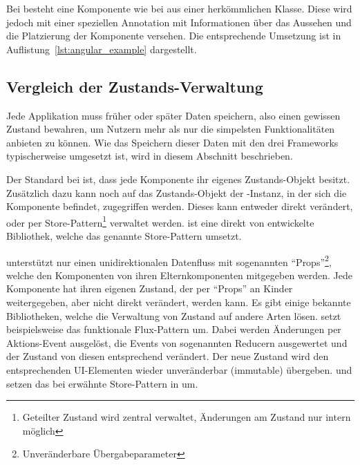\clearpage{}

Bei  besteht eine Komponente wie bei  aus einer herkömmlichen Klasse. Diese wird jedoch mit einer speziellen Annotation mit Informationen über das Aussehen und die Platzierung der Komponente versehen. Die entsprechende Umsetzung ist in Auflistung~\ref{lst:angular_example} dargestellt.



\subsection{Vergleich der Zustands-Verwaltung}
Jede Applikation muss früher oder später Daten speichern, also einen gewissen Zustand bewahren, um Nutzern mehr als nur die simpelsten Funktionalitäten anbieten zu können. Wie das Speichern dieser Daten mit den drei Frameworks typischerweise umgesetzt ist, wird in diesem Abschnitt beschrieben.

Der Standard bei  ist, dass jede Komponente ihr eigenes Zustands-Objekt besitzt. Zusätzlich dazu kann noch auf das Zustands-Objekt der -Instanz, in der sich die Komponente befindet, zugegriffen werden. Dieses kann entweder direkt verändert, oder per Store-Pattern\footnote{Geteilter Zustand wird zentral verwaltet, Änderungen am Zustand nur intern möglich} verwaltet werden.  ist eine direkt von  entwickelte Bibliothek, welche das genannte Store-Pattern umsetzt.

 unterstützt nur einen unidirektionalen Datenfluss mit sogenannten \enquote{Props}\footnote{Unveränderbare Übergabeparameter}, welche den Komponenten von ihren Elternkomponenten mitgegeben werden. Jede Komponente hat ihren eigenen Zustand, der per \enquote{Props} an Kinder weitergegeben, aber nicht direkt verändert, werden kann. Es gibt einige bekannte Bibliotheken, welche die Verwaltung von Zustand auf andere Arten lösen.  setzt beispielsweise das funktionale Flux-Pattern um. Dabei werden Änderungen per Aktions-Event ausgelöst, die Events von sogenannten Reducern ausgewertet und der Zustand von diesen entsprechend verändert. Der neue Zustand wird den entsprechenden UI-Elementen wieder unveränderbar (immutable) übergeben.  und  setzen das bei  erwähnte Store-Pattern in  um.

